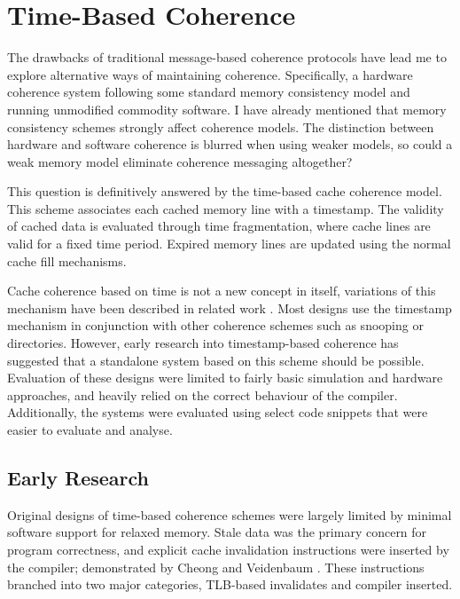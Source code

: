 	\section{Time-Based Coherence}
		\label{background_timebased}

		The drawbacks of traditional message-based coherence protocols have lead me to explore alternative ways of maintaining coherence. 
		Specifically, a hardware coherence system following some standard memory consistency model and running unmodified commodity software. 
		I have already mentioned that memory consistency schemes strongly affect coherence models. The distinction between hardware and software coherence is blurred when using weaker models, so could a weak memory model eliminate coherence messaging altogether? 

\clearpage
		This question is definitively answered by the time-based cache coherence model. This scheme associates each cached memory line with a timestamp.
		The validity of cached data is evaluated through time fragmentation, where cache lines are valid for a fixed time period. Expired memory lines are updated using the normal cache fill mechanisms.
		
		Cache coherence based on time is not a new concept in itself, variations of this mechanism have been described in related work \cite{Keleher94,Shim11,Lis11,Yu15_0,Yu15_1,Kurian15,Singh13,Singh14,Elver14}.
		Most designs use the timestamp mechanism in conjunction with other coherence schemes such as snooping or directories.
		However, early research into timestamp-based coherence has suggested that a standalone system based on this scheme should be possible. Evaluation of these designs were limited to fairly basic simulation and hardware approaches, and heavily relied on the correct behaviour of the compiler. Additionally, the systems were evaluated using select code snippets that were easier to evaluate and analyse.
		
			\subsection{Early Research}
				Original designs of time-based coherence schemes were largely limited by minimal software support for relaxed memory. Stale data was the primary concern for program correctness, and explicit cache invalidation instructions were inserted by the compiler; demonstrated by Cheong and Veidenbaum \cite{Cheong88,Hoichi90}. These instructions branched into two major categories, TLB-based invalidates and compiler inserted. 
				
